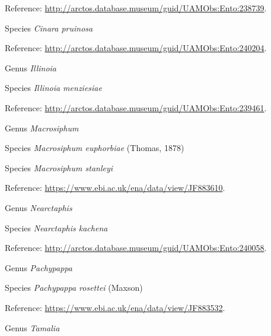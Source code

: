\documentclass[9pt, article]{memoir}
\begin{document}
\begin{multicols}{2}
Reference: 
\url{http://arctos.database.museum/guid/UAMObs:Ento:238739}.

\vspace{6pt}\noindent\hspace{36pt}Species \textit{Cinara pruinosa}


Reference: 
\url{http://arctos.database.museum/guid/UAMObs:Ento:240204}.

\vspace{6pt}\noindent\hspace{30pt}Genus \textit{Illinoia}


\vspace{6pt}\noindent\hspace{36pt}Species \textit{Illinoia menziesiae}


Reference: 
\url{http://arctos.database.museum/guid/UAMObs:Ento:239461}.

\vspace{6pt}\noindent\hspace{30pt}Genus \textit{Macrosiphum}


\vspace{6pt}\noindent\hspace{36pt}Species \textit{Macrosiphum euphorbiae} (Thomas, 1878)


\vspace{6pt}\noindent\hspace{36pt}Species \textit{Macrosiphum stanleyi}


Reference: 
\url{https://www.ebi.ac.uk/ena/data/view/JF883610}.

\vspace{6pt}\noindent\hspace{30pt}Genus \textit{Nearctaphis}


\vspace{6pt}\noindent\hspace{36pt}Species \textit{Nearctaphis kachena}


Reference: 
\url{http://arctos.database.museum/guid/UAMObs:Ento:240058}.

\vspace{6pt}\noindent\hspace{30pt}Genus \textit{Pachypappa}


\vspace{6pt}\noindent\hspace{36pt}Species \textit{Pachypappa rosettei} (Maxson)


Reference: 
\url{https://www.ebi.ac.uk/ena/data/view/JF883532}.

\vspace{6pt}\noindent\hspace{30pt}Genus \textit{Tamalia}



\end{multicols}
\end{document}
